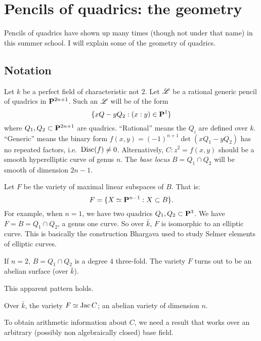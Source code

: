 
\section{Pencils of quadrics: the geometry}





Pencils of quadrics have shown up many times (though not under that name) in 
this summer school. I will explain some of the geometry of quadrics. 





\subsection{Notation}

Let $k$ be a perfect field of characteristic not $2$. Let $\mathscr{L}$ be a 
rational generic pencil of quadrics in $\mathbf{P}^{2n+1}$. Such an $\mathscr{L}$ will be 
of the form 
\[
  \{x Q-y Q_2:(x:y)\in \mathbf{P}^1\}
\]
where $Q_1,Q_2\subset \mathbf{P}^{2n+1}$ are quadrics. ``Rational'' means the $Q_i$ 
are defined over $k$. ``Generic'' means the binary form 
$f(x,y) = (-1)^{n+1}\det(x Q_1-y Q_2)$ has no repeated factors, 
i.e.~$\operatorname{Disc}(f)\ne 0$. Alternatively, $C:z^2=f(x,y)$ should be a smooth 
hyperelliptic curve of genus $n$. The \emph{base locus} $B=Q_1\cap Q_2$ will 
be smooth of dimension $2 n-1$. 

Let $F$ be the variety of maximal linear subspaces of $B$. That is: 
\[
  F=\{X\simeq \mathbf{P}^{n-1}:X\subset B\} .
\]
For example, when $n=1$, we have two quadrics $Q_1,Q_2\subset \mathbf{P}^3$. We have 
$F=B=Q_1\cap Q_2$, a genus one curve. So over $\bar k$, $F$ is isomorphic to an 
elliptic curve. This is basically the construction Bhargava used to study 
Selmer elements of elliptic curves. 

If $n=2$, $B=Q_1\cap Q_2$ is a degree $4$ three-fold. The variety $F$ turns 
out to be an abelian surface (over $\bar k$). 

This apparent pattern holds. 

\begin{theo}
Over $\bar k$, the variety $F\simeq \operatorname{Jac} C$; an abelian variety of 
dimension $n$. 
\end{theo}

To obtain arithmetic information about $C$, we need a result that works over 
an arbitrary (possibly non algebraically closed) base field. 


